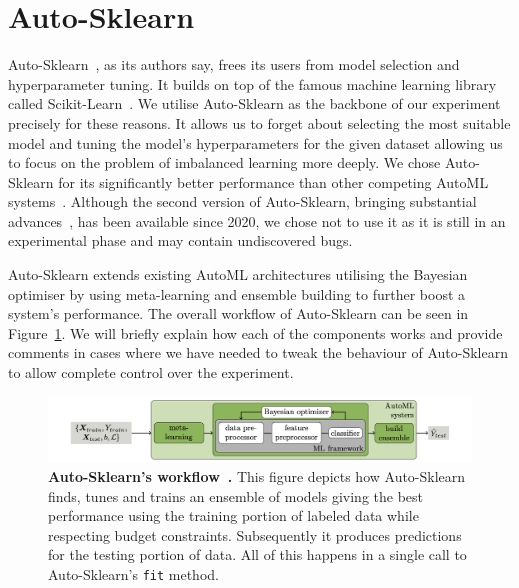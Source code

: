 \section{Auto-Sklearn}
\label{section:auto-sklearn}

Auto-Sklearn~\cite{auto-sklearn-1.0}, as its authors say, frees its users from model selection and
hyperparameter tuning. It builds on top of the famous machine learning library called
Scikit-Learn~\cite{sklearn}. We utilise Auto-Sklearn as the backbone of our experiment precisely
for these reasons. It allows us to forget about selecting the most suitable model and tuning the
model's hyperparameters for the given dataset allowing us to focus on the problem of imbalanced
learning more deeply. We chose Auto-Sklearn for its significantly better performance than other
competing AutoML systems~\cite{auto-sklearn-1.0}. Although the second version of Auto-Sklearn,
bringing substantial advances~\cite{auto-sklearn-2.0}, has been available since 2020, we chose not
to use it as it is still in an experimental phase and may contain undiscovered bugs.

Auto-Sklearn extends existing AutoML architectures utilising the Bayesian optimiser by using
meta-learning and ensemble building to further boost a system's performance. The overall workflow
of Auto-Sklearn can be seen in Figure~\ref{figure:auto-sklearn}. We will briefly explain how each
of the components works and provide comments in cases where we have needed to tweak the behaviour
of Auto-Sklearn to allow complete control over the experiment.

\begin{figure}
    \centering
    \includegraphics[width=\linewidth]{figures/auto-sklearn.png}
    \caption{
        \textbf{Auto-Sklearn's workflow~\cite{auto-sklearn-1.0}.} This figure depicts how
        Auto-Sklearn finds, tunes and trains an ensemble of models giving the best performance
        using the training portion of labeled data while respecting budget constraints.
        Subsequently it produces predictions for the testing portion of data. All of this happens
        in a single call to Auto-Sklearn's \texttt{fit} method.
    }
    \label{figure:auto-sklearn}
\end{figure}

